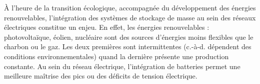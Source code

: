 \`{A} l'heure de la transition écologique, accompagnée du développement des énergies renouvelables, l'intégration des systèmes de stockage de masse au sein des réseaux électriques constitue un enjeu. En effet, les énergies renouvelables : photovoltaïque, éolien, nucléaire sont des sources d'énergies moins flexibles que le charbon ou le gaz. Les deux premières sont intermittentes (c.-à-d. dépendent des conditions environnementales) quand la dernière présente une production constante. Au sein du réseau électrique, l'intégration de batteries permet une meilleure maîtrise des pics ou des déficits de tension électrique.

